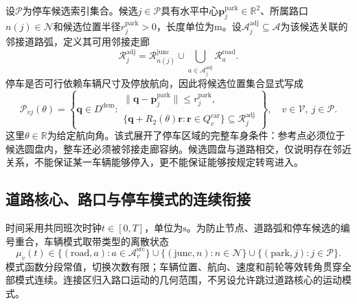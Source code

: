 设$\mathcal P$为停车候选索引集合。候选$j\in\mathcal P$具有水平中心$\mathbf p_j^{\mathrm{park}}\in\mathbb R^2$、所属路口$n(j)\in\mathcal N$和候选位置半径$r_j^{\mathrm{park}}>0$，长度单位为$\mathrm m$。设$\mathcal A_j^{\mathrm{adj}}\subseteq\mathcal A$为该候选关联的邻接道路弧，定义其可用邻接走廊
\begin{equation}
 \mathcal R_j^{\mathrm{adj}}
 =\mathcal R_{n(j)}^{\mathrm{junc}}
   \cup\bigcup_{a\in\mathcal A_j^{\mathrm{adj}}}
              \mathcal R_a^{\mathrm{road}}.
 \label{s0407:parking_adjacent_corridor}
\end{equation}
停车是否可行依赖车辆尺寸及停放航向，因此将候选位置集合显式写成
\begin{equation}
 \mathcal P_{vj}(\theta)
 =\left\{\mathbf q\in D^{\mathrm{dem}}:
 \begin{array}{l}
 \|\mathbf q-\mathbf p_j^{\mathrm{park}}\|
       \le r_j^{\mathrm{park}},\\
 \{\mathbf q+R_2(\theta)\mathbf r:
      \mathbf r\in Q_v^{\mathrm{car}}\}
      \subseteq\mathcal R_j^{\mathrm{adj}}
 \end{array}\right\},
 \quad v\in\mathcal V,\ j\in\mathcal P.
 \label{s0407:parking_position_set}
\end{equation}
这里$\theta\in\mathbb R$为给定航向角。该式展开了停车区域的完整车身条件：参考点必须位于候选圆盘内，整车还必须被邻接走廊容纳。候选圆盘与道路相交，仅说明存在邻近关系，不能保证某一车辆能够停入，更不能保证能够按规定转弯进入。

\subsection{道路核心、路口与停车模式的连续衔接}

时间采用共同班次时钟$t\in[0,T]$，单位为$\mathrm s$。为防止节点、道路弧和停车候选的编号重合，车辆模式取带类型的离散状态
\begin{equation}
 \mu_v(t)\in
 \{(\mathrm{road},a):a\in\mathcal A_v^{\mathrm{src}}\}
 \cup\{(\mathrm{junc},n):n\in\mathcal N\}
 \cup\{(\mathrm{park},j):j\in\mathcal P\}.
 \label{s0407:mode_domain}
\end{equation}
模式函数分段常值，切换次数有限；车辆位置、航向、速度和前轮等效转角贯穿全部模式连续。连接区归入路口运动的几何范围，不另设允许跳过道路核心的运动模式。

